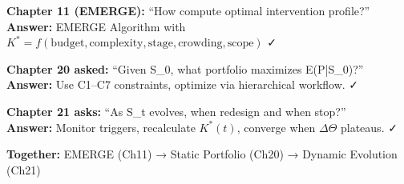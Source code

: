 \begin{center}
\textbf{Chapter 11 (EMERGE):} ``How compute optimal intervention profile?'' \\
\textbf{Answer:} EMERGE Algorithm with $K^* = f(\text{budget}, \text{complexity}, \text{stage}, \text{crowding}, \text{scope})$ ✓ \\

\vspace{0.3cm}

\textbf{Chapter 20 asked:} ``Given S_0, what portfolio maximizes E(P|S_0)?'' \\
\textbf{Answer:} Use C1--C7 constraints, optimize via hierarchical workflow. ✓ \\

\vspace{0.3cm}

\textbf{Chapter 21 asks:} ``As S_t evolves, when redesign and when stop?'' \\
\textbf{Answer:} Monitor triggers, recalculate $K^*(t)$, converge when $\Delta\Theta$ plateaus. ✓ \\

\vspace{0.3cm}

\textbf{Together:} EMERGE (Ch11) → Static Portfolio (Ch20) → Dynamic Evolution (Ch21)
\end{center}

